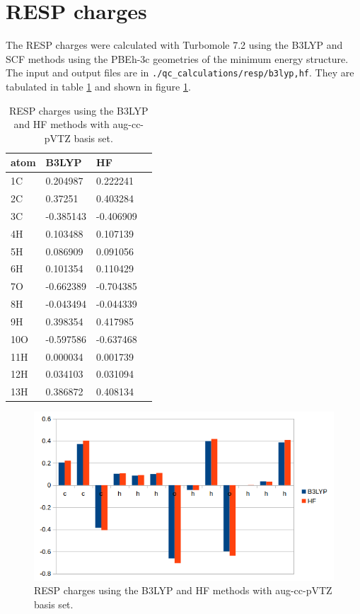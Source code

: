 \documentclass[10pt]{article}
\begin{document}
\newpage


\section{RESP charges}

The RESP charges were calculated with Turbomole 7.2 using the B3LYP and SCF methods using the PBEh-3c geometries of the minimum energy structure. The input and output files are in \texttt{./qc\_calculations/resp/{b3lyp,hf}}. They are tabulated in table \ref{fig:resp} and shown in figure \ref{fig:resp}.

\begin{table}[ht!]
	\centering
	\label{resp}
	\begin{tabular}{llll} \hline
		atom & B3LYP & HF        &           \\ \hline
		1C &    0.204987  & 0.222241  \\
		2C &    0.37251   & 0.403284  \\
		3C &    -0.385143 & -0.406909 \\
		4H &    0.103488  & 0.107139  \\
		5H &    0.086909  & 0.091056  \\
		6H &    0.101354  & 0.110429  \\
		7O &    -0.662389 & -0.704385 \\
		8H &    -0.043494 & -0.044339 \\
		9H &    0.398354  & 0.417985  \\
		10O &   -0.597586 & -0.637468 \\
		11H &   0.000034  & 0.001739  \\
		12H &   0.034103  & 0.031094  \\
		13H &   0.386872  & 0.408134 \\ \hline
	\end{tabular}
	\caption{RESP charges using the B3LYP and HF methods with aug-cc-pVTZ basis set.}
\end{table}

\begin{figure}[ht!]
\centering
\includegraphics[width=0.8\linewidth]{fig/resp}
\caption{RESP charges using the B3LYP and HF methods with aug-cc-pVTZ basis set.}
\label{fig:resp}
\end{figure}




\end{document}
